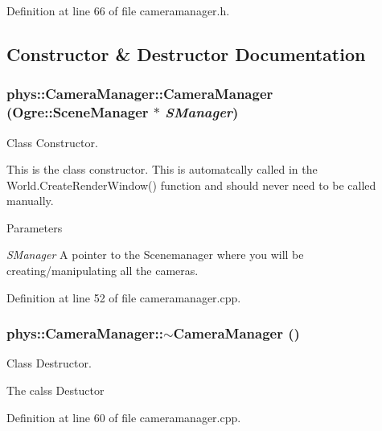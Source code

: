 Definition at line 66 of file cameramanager.h.



\subsection{Constructor \& Destructor Documentation}
\hypertarget{classphys_1_1CameraManager_aff47d21e0c80b2b1b44148b0ec7de344}{
\subsubsection[{CameraManager}]{\setlength{\rightskip}{0pt plus 5cm}phys::CameraManager::CameraManager (Ogre::SceneManager $\ast$ {\em SManager})}}
\label{d9/d91/classphys_1_1CameraManager_aff47d21e0c80b2b1b44148b0ec7de344}


Class Constructor. 

This is the class constructor. This is automatcally called in the World.CreateRenderWindow() function and should never need to be called manually. 
\begin{DoxyParams}{Parameters}
\item[{\em SManager}]A pointer to the Scenemanager where you will be creating/manipulating all the cameras. \end{DoxyParams}


Definition at line 52 of file cameramanager.cpp.

\hypertarget{classphys_1_1CameraManager_a0b0f032477309eb47b0302fd5eef198c}{
\subsubsection[{$\sim$CameraManager}]{\setlength{\rightskip}{0pt plus 5cm}phys::CameraManager::$\sim$CameraManager ()}}
\label{d9/d91/classphys_1_1CameraManager_a0b0f032477309eb47b0302fd5eef198c}


Class Destructor. 

The calss Destuctor 

Definition at line 60 of file cameramanager.cpp.



